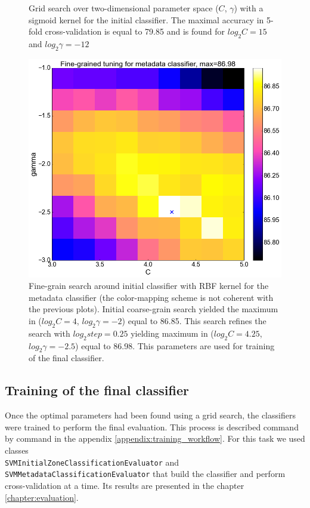 \begin{center}
\begin{figure}
  \caption{Grid search over two-dimensional parameter space ($C$, $\gamma$) with a sigmoid kernel for the initial classifier. The maximal accuracy in 5-fold cross-validation is equal to 79.85 and is found for $log_{2}C=15$ and $log_{2}\gamma=-12$}
  \label{fig:meta_sigmoid}
\end{figure}
\begin{figure}
	\centering
  \includegraphics[width=\textwidth]{plots/meta_fine}
  \caption{Fine-grain search around initial classifier with RBF kernel for the metadata classifier (the color-mapping scheme is not coherent with the previous plots). Initial coarse-grain search yielded the maximum in ($log_{2}C=4$, $log_{2}\gamma=-2$) equal to 86.85. This search refines the search with $log_{2}step=0.25$ yielding maximum in ($log_{2}C=4.25$, $log_{2}\gamma=-2.5$) equal to 86.98. This parameters are used for training of the final classifier.}
  \label{fig:meta_fine}
\end{figure}
\end{center}

\subsection{Training of the final classifier}
Once the optimal parameters had been found using a grid search, the classifiers were trained to perform the final evaluation. This process is described command by command in the appendix \ref{appendix:training_workflow}. For this task we used classes \\ \verb+SVMInitialZoneClassificationEvaluator+ and \\ \verb+SVMMetadataClassificationEvaluator+ that build the classifier and perform cross-validation at a time. Its results are presented in the chapter \ref{chapter:evaluation}.

